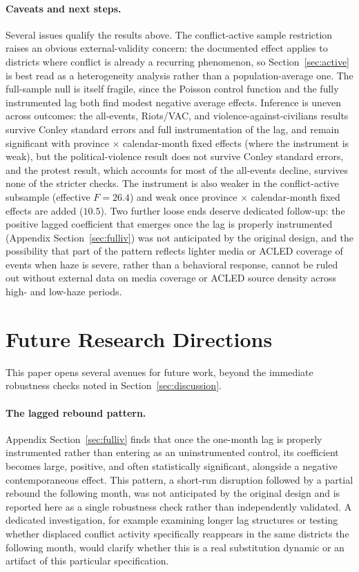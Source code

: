 \documentclass[12pt]{article}
\begin{document}
\paragraph{Caveats and next steps.} Several issues qualify the results above. The conflict-active sample restriction raises an obvious external-validity concern: the documented effect applies to districts where conflict is already a recurring phenomenon, so Section~\ref{sec:active} is best read as a heterogeneity analysis rather than a population-average one. The full-sample null is itself fragile, since the Poisson control function and the fully instrumented lag both find modest negative average effects. Inference is uneven across outcomes: the all-events, Riots/VAC, and violence-against-civilians results survive Conley standard errors and full instrumentation of the lag, and remain significant with province $\times$ calendar-month fixed effects (where the instrument is weak), but the political-violence result does not survive Conley standard errors, and the protest result, which accounts for most of the all-events decline, survives none of the stricter checks. The instrument is also weaker in the conflict-active subsample (effective $F = 26.4$) and weak once province $\times$ calendar-month fixed effects are added ($10.5$). Two further loose ends deserve dedicated follow-up: the positive lagged coefficient that emerges once the lag is properly instrumented (Appendix Section~\ref{sec:fulliv}) was not anticipated by the original design, and the possibility that part of the pattern reflects lighter media or ACLED coverage of events when haze is severe, rather than a behavioral response, cannot be ruled out without external data on media coverage or ACLED source density across high- and low-haze periods.

\section{Future Research Directions}
\label{sec:future}

This paper opens several avenues for future work, beyond the immediate robustness checks noted in Section~\ref{sec:discussion}.

\paragraph{The lagged rebound pattern.} Appendix Section~\ref{sec:fulliv} finds that once the one-month lag is properly instrumented rather than entering as an uninstrumented control, its coefficient becomes large, positive, and often statistically significant, alongside a negative contemporaneous effect. This pattern, a short-run disruption followed by a partial rebound the following month, was not anticipated by the original design and is reported here as a single robustness check rather than independently validated. A dedicated investigation, for example examining longer lag structures or testing whether displaced conflict activity specifically reappears in the same districts the following month, would clarify whether this is a real substitution dynamic or an artifact of this particular specification.
\end{document}
